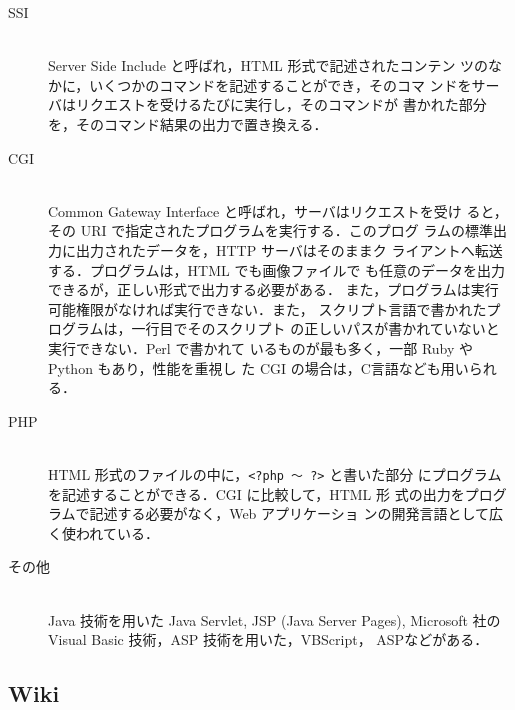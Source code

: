 \begin{description}
 \item[SSI] \mbox{} \\
            Server Side Include と呼ばれ，HTML 形式で記述されたコンテン
	    ツのなかに，いくつかのコマンドを記述することができ，そのコマ
	    ンドをサーバはリクエストを受けるたびに実行し，そのコマンドが
	    書かれた部分を，そのコマンド結果の出力で置き換える．
 \item[CGI] \mbox{} \\
            Common Gateway Interface と呼ばれ，サーバはリクエストを受け
	    ると，その URI で指定されたプログラムを実行する．このプログ
	    ラムの標準出力に出力されたデータを，HTTP サーバはそのままク
	    ライアントへ転送する．プログラムは，HTML でも画像ファイルで
	    も任意のデータを出力できるが，正しい形式で出力する必要がある．
	    また，プログラムは実行可能権限がなければ実行できない．また，
	    スクリプト言語で書かれたプログラムは，一行目でそのスクリプト
	    の正しいパスが書かれていないと実行できない．Perl で書かれて
	    いるものが最も多く，一部 Ruby や Python もあり，性能を重視し
	    た CGI の場合は，C言語なども用いられる．
 \item[PHP] \mbox{} \\
            HTML 形式のファイルの中に，\texttt{<?php 〜 ?>} と書いた部分
	    にプログラムを記述することができる．CGI に比較して，HTML 形
	    式の出力をプログラムで記述する必要がなく，Web アプリケーショ
	    ンの開発言語として広く使われている．
 \item[その他] \mbox{} \\
            Java 技術を用いた Java Servlet, JSP (Java Server Pages),
	    Microsoft 社の Visual Basic 技術，ASP 技術を用いた，VBScript，
	    ASPなどがある．%
\end{description}

\subsection{Wiki}

